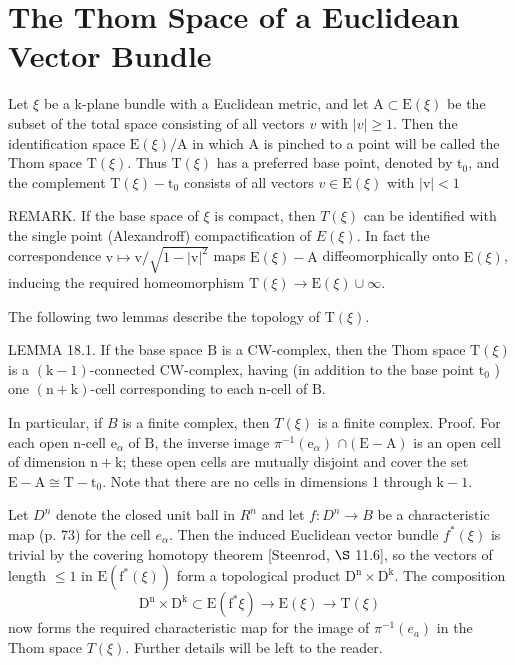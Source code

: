 \documentclass[10pt]{article}
\begin{document}
\section{The Thom Space of a Euclidean Vector Bundle}
Let $\xi$ be a k-plane bundle with a Euclidean metric, and let $\mathrm{A} \subset \mathrm{E}(\xi)$ be the subset of the total space consisting of all vectors $v$ with $|v| \geq 1$. Then the identification space $\mathrm{E}(\xi) / \mathrm{A}$ in which $\mathrm{A}$ is pinched to a point will be called the Thom space $\mathrm{T}(\xi)$. Thus $\mathrm{T}(\xi)$ has a preferred base point, denoted by $\mathrm{t}_{0}$, and the complement $\mathrm{T}(\xi)-\mathrm{t}_{0}$ consists of all vectors $v \in \mathrm{E}(\xi)$ with $|\mathrm{v}|<1$

REMARK. If the base space of $\xi$ is compact, then $T(\xi)$ can be identified with the single point (Alexandroff) compactification of $E(\xi)$. In fact the correspondence $\mathrm{v} \mapsto \mathrm{v} / \sqrt{1-|\mathrm{v}|^{2}}$ maps $\mathrm{E}(\xi)-\mathrm{A}$ diffeomorphically onto $\mathrm{E}(\xi)$, inducing the required homeomorphism $\mathrm{T}(\xi) \rightarrow \mathrm{E}(\xi) \cup \infty$.

The following two lemmas describe the topology of $\mathrm{T}(\xi)$.

LEMMA 18.1. If the base space $\mathrm{B}$ is a CW-complex, then the Thom space $\mathrm{T}(\xi)$ is a $(\mathrm{k}-1)$-connected $\mathrm{CW}$-complex, having (in addition to the base point $\mathrm{t}_{0}$ ) one $(\mathrm{n}+\mathrm{k})$-cell corresponding to each $\mathrm{n}$-cell of $\mathrm{B}$.

In particular, if $B$ is a finite complex, then $T(\xi)$ is a finite complex. Proof. For each open $\mathrm{n}$-cell $\mathrm{e}_{\alpha}$ of $\mathrm{B}$, the inverse image $\pi^{-1}\left(\mathrm{e}_{\alpha}\right)$ $\cap(\mathrm{E}-\mathrm{A})$ is an open cell of dimension $\mathrm{n}+\mathrm{k}$; these open cells are mutually disjoint and cover the set $\mathrm{E}-\mathrm{A} \cong \mathrm{T}-\mathrm{t}_{0}$. Note that there are no cells in dimensions 1 through $\mathrm{k}-1$.

Let $D^{n}$ denote the closed unit ball in $R^{n}$ and let $f: D^{n} \rightarrow B$ be a characteristic map (p. 73) for the cell $e_{\alpha}$. Then the induced Euclidean vector bundle $f^{*}(\xi)$ is trivial by the covering homotopy theorem [Steenrod, $\S$ 11.6], so the vectors of length $\leq 1$ in $\mathrm{E}\left(\mathrm{f}^{*}(\xi)\right)$ form a topological product $\mathrm{D}^{\mathrm{n}} \times \mathrm{D}^{\mathrm{k}}$. The composition
$$
\mathrm{D}^{\mathrm{n}} \times \mathrm{D}^{\mathrm{k}} \subset \mathrm{E}\left(\mathrm{f}^{*} \xi\right) \rightarrow \mathrm{E}(\xi) \rightarrow \mathrm{T}(\xi)
$$
now forms the required characteristic map for the image of $\pi^{-1}\left(e_{a}\right)$ in the Thom space $T(\xi)$. Further details will be left to the reader.
\end{document}
